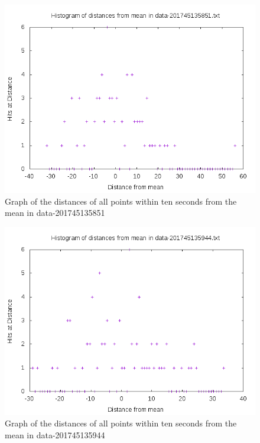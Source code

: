 \documentclass[10pt,letterpaper]{article}
\begin{document}
\begin{figure}[h]
\centering
\includegraphics[scale=0.5]{data-201745135851.png}
\caption{\label{fig:data-201745135851.png}Graph of the distances of all points within ten seconds from the mean in data-201745135851}
\end{figure}
\begin{figure}[h]
\centering
\includegraphics[scale=0.5]{data-201745135944.png}
\caption{\label{fig:data-201745135944.png}Graph of the distances of all points within ten seconds from the mean in data-201745135944}
\end{figure}
\end{document}
